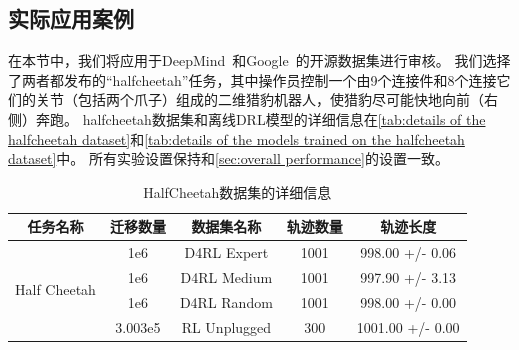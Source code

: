 \subsection{实际应用案例}
\label{sec:real-world application}
在本节中，我们将\sysnameo 应用于DeepMind~\cite{DBLP:conf/nips/Gulcehre0NPCZAM20}和Google~\cite{DBLP:conf/nips/Pomerleau88}的开源数据集进行审核。
我们选择了两者都发布的“halfcheetah”任务，其中操作员控制一个由9个连接件和8个连接它们的关节（包括两个爪子）组成的二维猎豹机器人，使猎豹尽可能快地向前（右侧）奔跑。
halfcheetah数据集和离线DRL模型的详细信息在\autoref{tab:details of the halfcheetah dataset}和\autoref{tab:details of the models trained on the halfcheetah dataset}中。
所有实验设置保持和\autoref{sec:overall performance}的设置一致。
\begin{table}[!ht]
    \small
    \caption{HalfCheetah数据集的详细信息}
    \label{tab:details of the halfcheetah dataset}
    \centering
    \begin{tabular}{ccccc}
    \toprule
    \textbf{任务名称}          & \textbf{迁移数量} & \textbf{数据集名称} & \textbf{轨迹数量} & \textbf{轨迹长度} \\ \hline
    \multirow{4}{*}{Half Cheetah} & 1e6                            & D4RL   Expert        & 1001                            & 998.00   +/- 0.06             \\
                                  & 1e6                            & D4RL   Medium        & 1001                            & 997.90   +/- 3.13             \\
                                  & 1e6                            & D4RL   Random        & 1001                            & 998.00 +/- 0.00               \\
                                  & 3.003e5                        & RL Unplugged         & 300                             & 1001.00 +/- 0.00              \\ \bottomrule
    \end{tabular}
\end{table}
    
